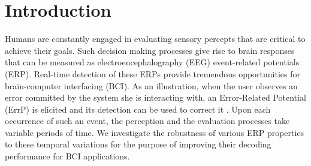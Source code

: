 \documentclass[12pt]{iopart}
\begin{document}

\section{Introduction}
\label{sec:intro}

Humans are constantly engaged in evaluating sensory percepts 
that are critical to achieve their goals. Such decision
making processes give rise to
brain responses that can be measured as electroencephalography (EEG)
event-related potentials (ERP).
Real-time detection of these ERPs
provide tremendous opportunities for brain-computer interfacing (BCI). 
As an illustration, when
the user observes an error committed by
the system she is interacting with, an Error-Related Potential (ErrP) is elicited
and its detection can be used to correct it \cite{chavarriaga_adaptation_2010}.
Upon each occurrence of such an event, the perception 
and the evaluation processes take variable periods of time.
We investigate the robustness of various ERP properties to these temporal
variations for the purpose of improving their decoding performance for BCI applications.



\end{document}
